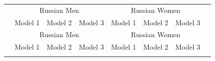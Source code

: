 \documentclass[12pt, a4paper]{article}
\begin{document}
	\begin{longtable}{l*{3}{c}|l*{3}{c}}
		\toprule
				& \multicolumn{3}{c|}{Russian Men} & \multicolumn{3}{c}{Russian Women} \\
				&\multicolumn{1}{c}{Model 1}&\multicolumn{1}{c}{Model 2}&\multicolumn{1}{c|}{Model 3}&\multicolumn{1}{c}{Model 1}&\multicolumn{1}{c}{Model 2}&\multicolumn{1}{c}{Model 3}\\
						\midrule
		\endfirsthead
		\toprule
						& \multicolumn{3}{c|}{Russian Men} & \multicolumn{3}{c}{Russian Women} \\
				&\multicolumn{1}{c}{Model 1}&\multicolumn{1}{c}{Model 2}&\multicolumn{1}{c|}{Model 3}&\multicolumn{1}{c}{Model 1}&\multicolumn{1}{c}{Model 2}&\multicolumn{1}{c}{Model 3}\\
						\midrule
		\endhead
		\midrule
		\endfoot
		\bottomrule
		\endlastfoot



\end{longtable}
\end{document}
